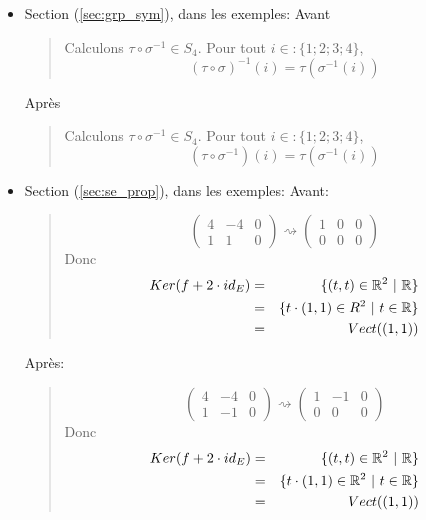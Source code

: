 \begin{itemize}
\begin{itemize}
      \item Section (\ref{sec:grp_sym}), dans les exemples: Avant
        \begin{quote}
          Calculons $\tau \circ \sigma^{-1} \in S_4$. Pour tout $i \in :\{1; 2; 3; 4\}$,
          $$(\tau \circ \sigma)^{-1}(i) = \tau(\sigma^{-1}(i))$$
        \end{quote}
        Après
        \begin{quote}
          Calculons $\tau \circ \sigma^{-1} \in S_4$. Pour tout $i \in :\{1; 2; 3; 4\}$,
          $$(\tau \circ \sigma^{-1})(i) = \tau(\sigma^{-1}(i))$$
        \end{quote}
        
      \item Section (\ref{sec:se_prop}), dans les exemples: Avant:
        \begin{quote}
          $$\left( \begin{array}{cc|c} 4 & -4 & 0 \\ 1 & 1 & 0 \end{array} \right) 
            \rightsquigarrow 
            \left( \begin{array}{cc|c} 1 & 0 & 0 \\ 0 & 0 & 0 \end{array} \right) $$
          Donc 
          \begin{eqnarray*}
            Ker(f + 2 \cdot id_E) &=& \{(t, t) \in \mathbb{R}^2 ~ \vert ~ \mathbb{R} \} \\
              &=& \{t \cdot (1, 1) \in R^2 ~ \vert ~ t \in \mathbb{R} \} \\
              &=& Vect((1, 1))
          \end{eqnarray*}
        \end{quote}
        Après:
        \begin{quote}
          $$\left( \begin{array}{cc|c} 4 & -4 & 0 \\ 1 & -1 & 0 \end{array} \right) 
            \rightsquigarrow 
            \left( \begin{array}{cc|c} 1 & -1 & 0 \\ 0 & 0 & 0 \end{array} \right) $$
          Donc 
          \begin{eqnarray*}
            Ker(f + 2 \cdot id_E) &=& \{(t, t) \in \mathbb{R}^2 ~ \vert ~ \mathbb{R} \} \\
              &=& \{t \cdot (1, 1) \in \mathbb{R}^2 ~ \vert ~ t \in \mathbb{R} \} \\
              &=& Vect((1, 1))
          \end{eqnarray*}
        \end{quote}
        
    \end{itemize}
\end{itemize}
